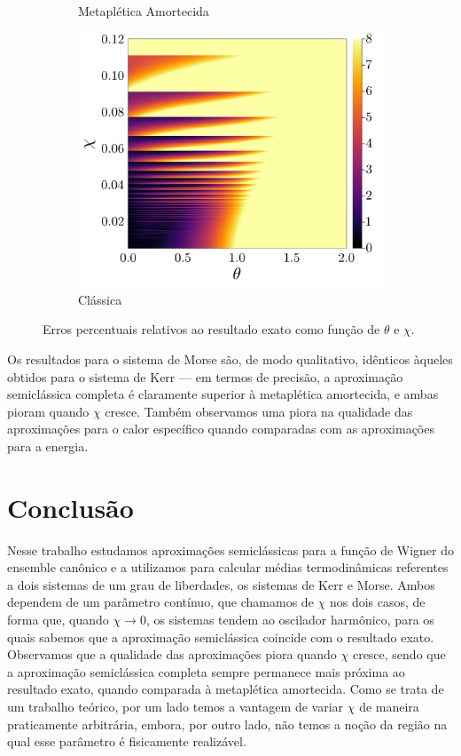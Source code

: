 \documentclass[
	12pt,
	oneside,			%
	a4paper,			%
	english,			%
	brazil				%
	]{abntex2}
\theoremstyle{definition}
\begin{document}
\begin{figure}[H]
\begin{subfigure}[b]{0.32\textwidth}
         \caption{Metaplética Amortecida}
         \label{erro relativo calor morse dm}
     \end{subfigure}
     \hfill
     \begin{subfigure}[b]{0.32\textwidth}
         \centering
         \includegraphics[width=\textwidth]{Imagens/erro_calor_cl_morse.png}
         \caption{Clássica}
         \label{erro relativo calor morse cl}
     \end{subfigure}
        \caption{Erros percentuais relativos ao resultado exato como função de $\theta$ e $\chi$.}
        \label{erros relativos calor morse}
\end{figure}

Os resultados para o sistema de Morse são, de modo qualitativo, idênticos àqueles obtidos para o sistema de Kerr — em termos de precisão, a aproximação semiclássica completa é claramente superior à metaplética amortecida, e ambas pioram quando $\chi$ cresce. Também observamos uma piora na qualidade das aproximações para o calor específico quando comparadas com as aproximações para a energia. 


\chapter{Conclusão}

Nesse trabalho estudamos aproximações semiclássicas para a função de Wigner do ensemble canônico e a utilizamos para calcular médias termodinâmicas referentes a dois sistemas de um grau de liberdades, os sistemas de Kerr e Morse. Ambos dependem de um parâmetro contínuo, que chamamos de $\chi$ nos dois casos, de forma que, quando $\chi \to 0$, os sistemas tendem ao oscilador harmônico, para os quais sabemos que a aproximação semiclássica coincide com o resultado exato. Observamos que a qualidade das aproximações piora quando $\chi$ cresce, sendo que a aproximação semiclássica completa sempre permanece mais próxima ao resultado exato, quando comparada à metaplética amortecida. Como se trata de um trabalho teórico, por um lado temos a vantagem de variar $\chi$ de maneira praticamente arbitrária, embora, por outro lado, não temos a noção da região na qual esse parâmetro é fisicamente realizável.
\end{document}

